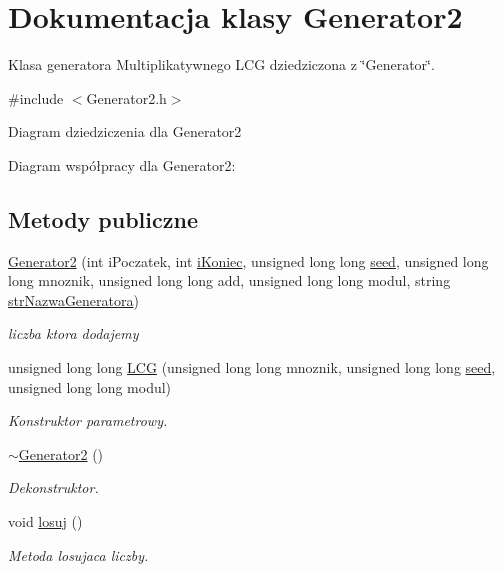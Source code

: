 \hypertarget{classGenerator2}{\section{Dokumentacja klasy Generator2}
\label{classGenerator2}
}


Klasa generatora Multiplikatywnego L\+C\+G dziedziczona z \char`\"{}\+Generator\char`\"{}.  




{\ttfamily \#include $<$Generator2.\+h$>$}



Diagram dziedziczenia dla Generator2


Diagram współpracy dla Generator2\+:
\subsection*{Metody publiczne}
\begin{DoxyCompactItemize}
\item 
\hyperlink{classGenerator2_a3dfa71293f5dd70d1cf3a30d7676d043}{Generator2} (int i\+Poczatek, int \hyperlink{classGenerator_a235b3d02ce62d19e803cc2295eb7911e}{i\+Koniec}, unsigned long long \hyperlink{classGenerator_ae77446ccb4946b8eb28d0f20f3e4a95f}{seed}, unsigned long long mnoznik, unsigned long long add, unsigned long long modul, string \hyperlink{classGenerator_a7e2c131c26baf31bb3f072115c619d1c}{str\+Nazwa\+Generatora})
\begin{DoxyCompactList}\small\item\em liczba ktora dodajemy \end{DoxyCompactList}\item 
unsigned long long \hyperlink{classGenerator2_a4df292bb376f2ff9ea44721fda384c0a}{L\+C\+G} (unsigned long long mnoznik, unsigned long long \hyperlink{classGenerator_ae77446ccb4946b8eb28d0f20f3e4a95f}{seed}, unsigned long long modul)
\begin{DoxyCompactList}\small\item\em Konstruktor parametrowy. \end{DoxyCompactList}\item 
\hypertarget{classGenerator2_a44a1eb78b1e847318969b476dc22746d}{\hyperlink{classGenerator2_a44a1eb78b1e847318969b476dc22746d}{$\sim$\+Generator2} ()}\label{classGenerator2_a44a1eb78b1e847318969b476dc22746d}

\begin{DoxyCompactList}\small\item\em Dekonstruktor. \end{DoxyCompactList}\item 
void \hyperlink{classGenerator2_a96705c3ab595c06470c3bbb0c24881b0}{losuj} ()
\begin{DoxyCompactList}\small\item\em Metoda losujaca liczby. \end{DoxyCompactList}\end{DoxyCompactItemize}
